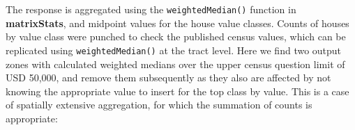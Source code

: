 \documentclass[]{book}
\newenvironment{Shaded}{\begin{snugshade}}{\end{snugshade}}
\newcommand{\DataTypeTok}[1]{\textcolor[rgb]{0.13,0.29,0.53}{#1}}
\newcommand{\DecValTok}[1]{\textcolor[rgb]{0.00,0.00,0.81}{#1}}
\newcommand{\KeywordTok}[1]{\textcolor[rgb]{0.13,0.29,0.53}{\textbf{#1}}}
\newcommand{\NormalTok}[1]{#1}
\newcommand{\OperatorTok}[1]{\textcolor[rgb]{0.81,0.36,0.00}{\textbf{#1}}}
\newcommand{\StringTok}[1]{\textcolor[rgb]{0.31,0.60,0.02}{#1}}
\begin{document}
\begin{Shaded}
\end{Shaded}

The response is aggregated using the \texttt{weightedMedian()} function in \textbf{matrixStats}, and midpoint values for the house value classes. Counts of houses by value class were punched to check the published census values, which can be replicated using \texttt{weightedMedian()} at the tract level. Here we find two output zones with calculated weighted medians over the upper census question limit of USD 50,000, and remove them subsequently as they also are affected by not knowing the appropriate value to insert for the top class by value. This is a case of spatially extensive aggregation, for which the summation of counts is appropriate:
\end{document}

